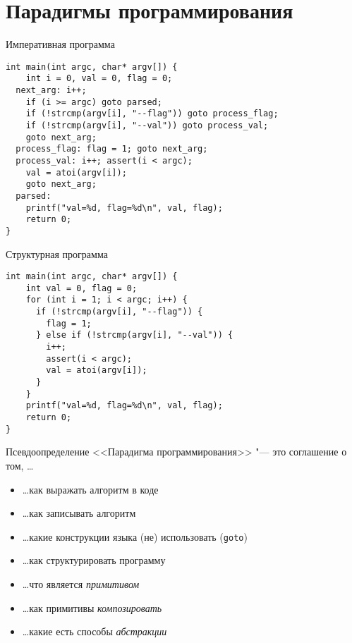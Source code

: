 \section{Парадигмы программирования}
\begin{frame}
\maketitle
\end{frame}

\begin{frame}[t,fragile]{Императивная программа}
\begin{verbatim}
int main(int argc, char* argv[]) {
    int i = 0, val = 0, flag = 0;
  next_arg: i++;
    if (i >= argc) goto parsed;
    if (!strcmp(argv[i], "--flag")) goto process_flag;
    if (!strcmp(argv[i], "--val")) goto process_val;
    goto next_arg;
  process_flag: flag = 1; goto next_arg;
  process_val: i++; assert(i < argc);
    val = atoi(argv[i]);
    goto next_arg;
  parsed:
    printf("val=%d, flag=%d\n", val, flag);
    return 0;
}
\end{verbatim}
\end{frame}

\begin{frame}[t,fragile]{Структурная программа}
\begin{verbatim}
int main(int argc, char* argv[]) {
    int val = 0, flag = 0;
    for (int i = 1; i < argc; i++) {
      if (!strcmp(argv[i], "--flag")) {
        flag = 1;
      } else if (!strcmp(argv[i], "--val")) {
        i++;
        assert(i < argc);
        val = atoi(argv[i]);
      }
    }
    printf("val=%d, flag=%d\n", val, flag);
    return 0;
}
\end{verbatim}
\end{frame}

\begin{frame}[t,fragile]{Псевдоопределение}
	<<Парадигма программирования>> "--- это соглашение о том, \ldots
	\begin{itemize}
	\item \ldots как выражать алгоритм в коде
	\item \ldots как записывать алгоритм
	\item \ldots какие конструкции языка (не) использовать (\verb!goto!)
	\item \ldots как структурировать программу
	\item \ldots что является \textit{примитивом}
	\item \ldots как примитивы \textit{композировать}
	\item \ldots какие есть способы \textit{абстракции}
	\end{itemize}
\end{frame}

